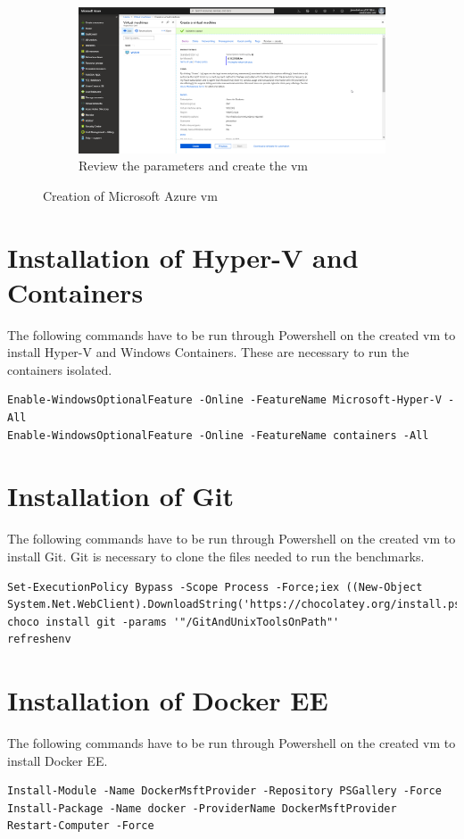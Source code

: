 \begin{figure}[h]\ContinuedFloat
	\begin{subfigure}{\textwidth}
		\captionsetup{width=0.9\linewidth}
		\includegraphics[width=\linewidth]{img/Container_VM_2.png}
		\centering
		\caption{Review the parameters and create the \acrshort{vm}}
		\label{fig:Container_VM_2}
	\end{subfigure}
	\caption{Creation of Microsoft Azure \acrshort{vm}}
	\label{fig:Container_VM}
\end{figure}
\clearpage
\section{Installation of Hyper-V and Containers}
The following commands have to be run through Powershell on the created \acrshort{vm} to install Hyper-V and Windows Containers. These are necessary to run the containers isolated.
\begin{lstlisting}[breaklines]
Enable-WindowsOptionalFeature -Online -FeatureName Microsoft-Hyper-V -All
Enable-WindowsOptionalFeature -Online -FeatureName containers -All
\end{lstlisting}
\section{Installation of Git}
The following commands have to be run through Powershell on the created \acrshort{vm} to install Git. Git is necessary to clone the files needed to run the benchmarks.
\begin{lstlisting}[breaklines]
Set-ExecutionPolicy Bypass -Scope Process -Force;iex ((New-Object System.Net.WebClient).DownloadString('https://chocolatey.org/install.ps1'))
choco install git -params '"/GitAndUnixToolsOnPath"'
refreshenv
\end{lstlisting}
\section{Installation of Docker EE}
The following commands have to be run through Powershell on the created \acrshort{vm} to install Docker EE.
\begin{lstlisting}[breaklines]
Install-Module -Name DockerMsftProvider -Repository PSGallery -Force
Install-Package -Name docker -ProviderName DockerMsftProvider
Restart-Computer -Force
\end{lstlisting}